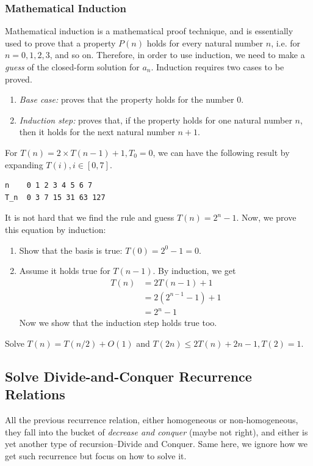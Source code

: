\documentclass[../main.tex]{subfiles}
\begin{document}
\subsubsection{Mathematical Induction}
Mathematical induction is a mathematical proof technique, and is essentially used to prove that a property $P(n)$ holds for every natural number $n$, i.e. for $n=0, 1, 2, 3$, and so on. Therefore, in order to use induction, we need to make a \textit{guess} of the closed-form solution for $a_n$. Induction requires two cases to be proved. 
\begin{enumerate}
    \item 
 \textit{Base case:} proves that the property holds for the number $0$. 
\item \textit{Induction step:} proves that, if the property holds for one natural number $n$, then it holds for the next natural number $n+1$.
\end{enumerate}

For $T(n)=2\times T(n-1) +1, T_0 = 0$, we can have the following result by expanding $T(i), i \in [0, 7]$.
\begin{lstlisting}[numbers=none]
n    0 1 2 3 4 5 6 7
T_n  0 3 7 15 31 63 127
\end{lstlisting}
It is not hard that we find the rule and guess $T(n) = 2^n-1$. Now, we prove this equation by induction:
\begin{enumerate}
    \item Show that the basis is true: $T(0) = 2^0 -1 = 0$.
    \item Assume it holds true for $T(n-1)$. By induction, we get
    \begin{align}
        T(n)&=2T(n-1) + 1 \\
        &=2 (2^{n-1} - 1) + 1 \\
        &= 2^n -1
    \end{align}
    Now we show that the induction step holds true too. 
\end{enumerate}

\begin{bclogo}[couleur = blue!30, arrondi=0.1,logo=\bccrayon,ombre=true]{Solve $T(n)=T(n/2)+O(1)$ and $T(2n)\leq2T(n)+2n-1, T(2)=1$.}
\end{bclogo}
 
 \subsection{Solve Divide-and-Conquer Recurrence Relations}
All the previous recurrence relation, either homogeneous or non-homogeneous, they fall into the bucket of \textit{decrease and conquer} (maybe not right), and either is yet another type of recursion--Divide and Conquer. Same here, we ignore how we get such recurrence but focus on how to solve it. 
\end{document}
